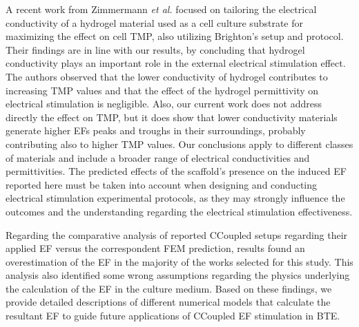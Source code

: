 A recent work from Zimmermann \textit{et al.} \cite{Zimmermann2020-cc} focused on tailoring the electrical conductivity of a hydrogel material used as a cell culture substrate for maximizing the effect on cell \ac{TMP}, also utilizing Brighton's setup and protocol. Their findings are in line with our results, by concluding that hydrogel conductivity plays an important role in the external electrical stimulation effect. The authors observed that the lower conductivity of hydrogel contributes to increasing \acs{TMP} values and that the effect of the hydrogel permittivity on electrical stimulation is negligible. Also, our current work does not address directly the effect on \acs{TMP},  but it does show that lower conductivity materials generate higher \acs{EF}s peaks and troughs in their surroundings, probably contributing also to higher \acs{TMP} values. Our conclusions apply to different classes of materials and include a broader range of electrical conductivities and permittivities. The predicted effects of the scaffold's presence on the induced \acs{EF} reported here must be taken into account when designing and conducting electrical stimulation experimental protocols, as they may strongly influence the outcomes and the understanding regarding the electrical stimulation effectiveness.    



Regarding the comparative analysis of reported \acs{CCoupled} setups regarding their applied \acs{EF} versus the correspondent \acs{FEM} prediction, results found an overestimation of the \acs{EF} in the majority of the works selected for this study. This analysis also identified some wrong assumptions regarding the physics underlying the calculation of the \acs{EF} in the culture medium. Based on these findings, we provide detailed descriptions of different numerical models that calculate the resultant \acs{EF} to guide future applications of \acs{CCoupled} \acs{EF} stimulation in \acs{BTE}. 

